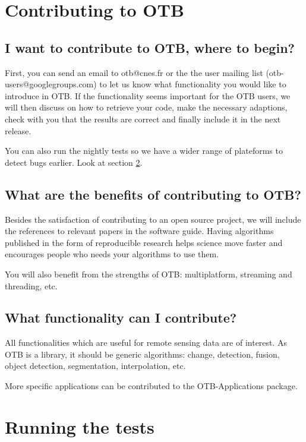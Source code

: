 \section{Contributing to OTB}\label{sec:contributing}

\subsection{I want to contribute to OTB, where to begin?}

First, you can send an email to otb@cnes.fr or the the user mailing list (otb-users@googlegroups.com) 
to let us know what functionality
you would like to introduce in OTB. If the functionality seems important for the
OTB users, we will then discuss on how to retrieve your code,
make the necessary adaptions, check with you that the results are correct and finally
include it in the next release.

You can also run the nightly tests so we have a wider range of plateforms to detect
bugs earlier. Look at section \ref{sec:runningTheTests}.

\subsection{What are the benefits of contributing to OTB?}

Besides the satisfaction of contributing to an open source project, we will include
the references to relevant papers in the software guide. Having algorithms
published in the form of reproducible research helps science move faster and
encourages people who needs your algorithms to use them.

You will also benefit from the strengths of OTB: multiplatform, streaming and
threading, etc.

\subsection{What functionality can I contribute?}

All functionalities which are useful for remote sensing data are of interest. As
OTB is a library, it should be generic algorithms: change, detection, fusion,
object detection, segmentation, interpolation, etc.

More specific applications can be contributed to the OTB-Applications package.

\section{Running the tests}\label{sec:runningTheTests}

